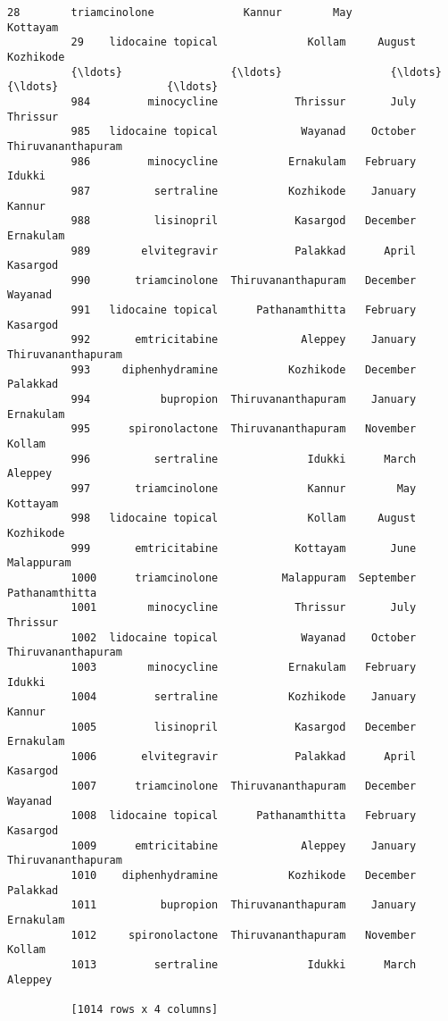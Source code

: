 \documentclass[11pt]{article}
\begin{document}
\begin{Verbatim}[commandchars=\\\{\}]
          28        triamcinolone              Kannur        May            Kottayam
          29    lidocaine topical              Kollam     August           Kozhikode
          {\ldots}                 {\ldots}                 {\ldots}        {\ldots}                 {\ldots}
          984         minocycline            Thrissur       July            Thrissur
          985   lidocaine topical             Wayanad    October  Thiruvananthapuram
          986         minocycline           Ernakulam   February              Idukki
          987          sertraline           Kozhikode    January              Kannur
          988          lisinopril            Kasargod   December           Ernakulam
          989        elvitegravir            Palakkad      April            Kasargod
          990       triamcinolone  Thiruvananthapuram   December             Wayanad
          991   lidocaine topical      Pathanamthitta   February            Kasargod
          992       emtricitabine             Aleppey    January  Thiruvananthapuram
          993     diphenhydramine           Kozhikode   December            Palakkad
          994           bupropion  Thiruvananthapuram    January           Ernakulam
          995      spironolactone  Thiruvananthapuram   November              Kollam
          996          sertraline              Idukki      March             Aleppey
          997       triamcinolone              Kannur        May            Kottayam
          998   lidocaine topical              Kollam     August           Kozhikode
          999       emtricitabine            Kottayam       June          Malappuram
          1000      triamcinolone          Malappuram  September      Pathanamthitta
          1001        minocycline            Thrissur       July            Thrissur
          1002  lidocaine topical             Wayanad    October  Thiruvananthapuram
          1003        minocycline           Ernakulam   February              Idukki
          1004         sertraline           Kozhikode    January              Kannur
          1005         lisinopril            Kasargod   December           Ernakulam
          1006       elvitegravir            Palakkad      April            Kasargod
          1007      triamcinolone  Thiruvananthapuram   December             Wayanad
          1008  lidocaine topical      Pathanamthitta   February            Kasargod
          1009      emtricitabine             Aleppey    January  Thiruvananthapuram
          1010    diphenhydramine           Kozhikode   December            Palakkad
          1011          bupropion  Thiruvananthapuram    January           Ernakulam
          1012     spironolactone  Thiruvananthapuram   November              Kollam
          1013         sertraline              Idukki      March             Aleppey
          
          [1014 rows x 4 columns]
\end{Verbatim}
            
\end{document}
